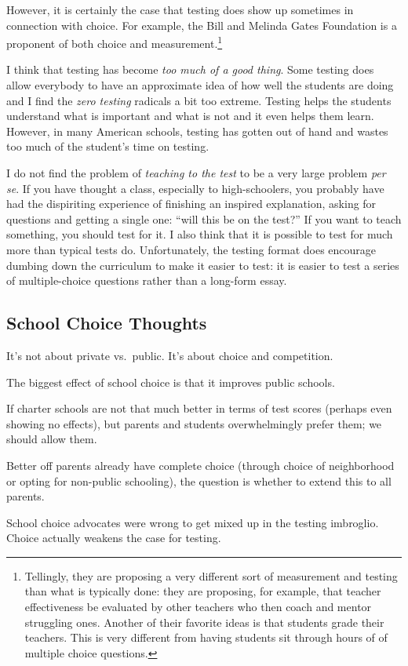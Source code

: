 However, it is certainly the case that testing does show up sometimes in
connection with choice. For example, the Bill and Melinda Gates Foundation is a
proponent of both choice and measurement.\footnote{Tellingly, they are
proposing a very different sort of measurement and testing than what is
typically done: they are proposing, for example, that teacher effectiveness be
evaluated by other teachers who then coach and mentor struggling ones. Another
of their favorite ideas is that students grade their teachers. This is very
different from having students sit through hours of of multiple choice
questions.}

I think that testing has become \emph{too much of a good thing}. Some testing
does allow everybody to have an approximate idea of how well the students are
doing and I find the \emph{zero testing} radicals a bit too extreme. Testing
helps the students understand what is important and what is not and it even
helps them learn.  However, in many
American schools, testing has gotten out of hand and wastes too much of
the student's time on testing.

I do not find the problem of \emph{teaching to the test} to be a very large
problem \emph{per se}. If you have thought a class, especially to
high-schoolers, you probably have had the dispiriting experience of finishing
an inspired explanation, asking for questions and getting a single one: ``will
this be on the test?'' If you want to teach something, you should test for it.
I also think that it is possible to test for much more than typical tests do.
Unfortunately, the testing format does encourage dumbing down the curriculum to
make it easier to test: it is easier to test a series of multiple-choice
questions rather than a long-form essay.

\subsection{School Choice Thoughts}

\thought It's not about private vs.\ public. It's about choice and competition.

\thought The biggest effect of school choice is that it improves public schools.

\thought If charter schools are not that much better in terms of test scores
(perhaps even showing no effects), but parents and students overwhelmingly
prefer them; we should allow them.

\thought Better off parents already have complete choice (through choice of
neighborhood or opting for non-public schooling), the question is whether to
extend this to all parents.

\thought School choice advocates were wrong to get mixed up in the testing
imbroglio. Choice actually weakens the case for testing.

